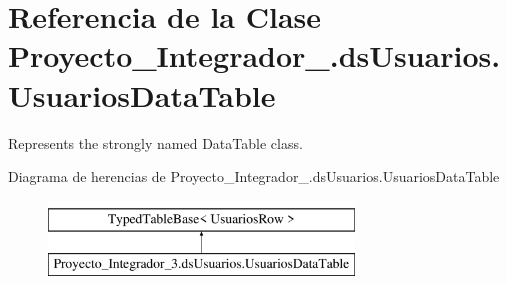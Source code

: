 \hypertarget{class_proyecto___integrador__3_1_1ds_usuarios_1_1_usuarios_data_table}{\section{Referencia de la Clase Proyecto\-\_\-\-Integrador\-\_.\-ds\-Usuarios.\-Usuarios\-Data\-Table}
\label{class_proyecto___integrador__3_1_1ds_usuarios_1_1_usuarios_data_table}
}


Represents the strongly named Data\-Table class.  


Diagrama de herencias de Proyecto\-\_\-\-Integrador\-\_.\-ds\-Usuarios.\-Usuarios\-Data\-Table\begin{figure}[H]
\begin{center}
\leavevmode
\includegraphics[height=2.000000cm]{d1/d43/class_proyecto___integrador__3_1_1ds_usuarios_1_1_usuarios_data_table}
\end{center}
\end{figure}
